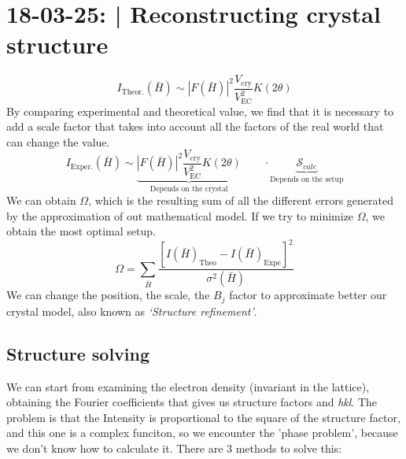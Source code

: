 \section{18-03-25: | Reconstructing crystal structure}

\begin{equation}
    I_{\text{Theor.}} (\bar{H}) \sim |F(\bar{H})|^2 \frac{V_{\text{cry}}}{V_{\text{EC}}^2}K(2\theta)
\end{equation}
By comparing experimental and theoretical value, we find that it is necessary to add a scale factor that takes into account all the factors of the real world that can change the value.
\begin{equation}
    I_{\text{Exper.}} (\bar{H}) \sim \underbrace{|F(\bar{H})|^2 \frac{V_{\text{cry}}}{V_{\text{EC}}^2}K(2\theta)}_{\text{Depends on the crystal}} \qquad\cdot\underbrace{\mathcal{S}_{cale}}_{\text{Depends on the setup}}
\end{equation}
We can obtain $\Omega$, which is the resulting sum of all the different errors generated by the approximation of out mathematical model. If we try to minimize $\Omega$, we obtain the most optimal setup.
\begin{equation}
    \Omega = \sum_{\bar{H}} \frac{\left[I(\bar{H})_{\text{Theo}} - I(\bar{H})_{\text{Expe}}\right]^2}{\sigma^2(\bar{H})}
\end{equation}
We can change the position, the scale, the $B_j$ factor to approximate better our crystal model, also known as \textit{`Structure refinement'}.

\subsection{Structure solving}

We can start from examining the electron density (invariant in the lattice), obtaining the Fourier coefficients that gives us structure factors and \textit{hkl}. The problem is that the Intensity is proportional to the square of the structure factor, and this one is a complex funciton, so we encounter the 'phase problem', because we don't know how to calculate it. There are 3 methods to solve this:

